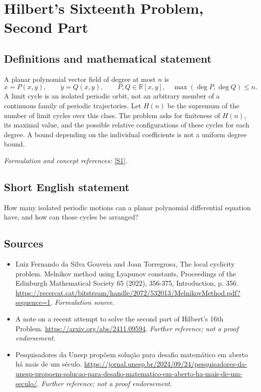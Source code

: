 \documentclass[11pt]{article}
\begin{document}
\section*{\texorpdfstring{Hilbert's Sixteenth Problem, Second Part}{Hilbert's Sixteenth Problem, Second Part}}\label{40}
\subsection{Definitions and mathematical statement}
A planar polynomial vector field of degree at most $n$ is
\[
 \dot x=P(x,y),\qquad\dot y=Q(x,y),\qquad P,Q\in{\mathbb{R}}[x,y],\quad\max(\deg P,\deg Q)\le n.
\]
A limit cycle is an isolated periodic orbit, not an arbitrary member of a continuous family of periodic trajectories. Let $H(n)$ be the supremum of the number of limit cycles over this class. The problem asks for finiteness of $H(n)$, its maximal value, and the possible relative configurations of these cycles for each degree. A bound depending on the individual coefficients is not a uniform degree bound.
\par\smallskip\textit{Formulation and concept references:} \href{https://recercat.cat/bitstream/handle/2072/532013/MelnikovMethod.pdf?sequence=1}{[S1]}.

\subsection{Short English statement}
How many isolated periodic motions can a planar polynomial differential equation have, and how can those cycles be arranged?
\subsection{Sources}
\begin{itemize}
\item[S1]Luiz Fernando da Silva Gouveia and Joan Torregrosa, The local cyclicity problem. Melnikov method using Lyapunov constants, Proceedings of the Edinburgh Mathematical Society 65 (2022), 356-375, Introduction, p. 356.
\url{https://recercat.cat/bitstream/handle/2072/532013/MelnikovMethod.pdf?sequence=1}.
\textit{Formulation source.}
\item[S2]A note on a recent attempt to solve the second part of Hilbert's 16th Problem.
\url{https://arxiv.org/abs/2411.09594}.
\textit{Further reference; not a proof endorsement.}
\item[S3]Pesquisadores da Unesp propõem solução para desafio matemático em aberto há mais de um século.
\url{https://jornal.unesp.br/2024/09/24/pesquisadores-da-unesp-propoem-solucao-para-desafio-matematico-em-aberto-ha-mais-de-um-seculo/}.
\textit{Further reference; not a proof endorsement.}
\end{itemize}
\end{document}
